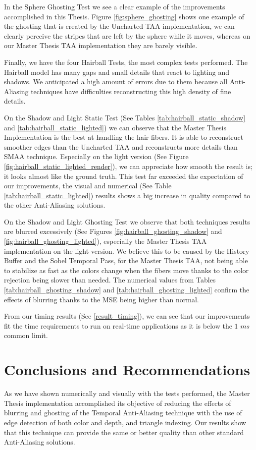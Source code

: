 \documentclass[pregrado]{tesis-usb} %
\begin{document}
In the Sphere Ghosting Test we see a clear example of the improvements accomplished in this Thesis. Figure \ref{fig:sphere_ghosting} shows one example of the ghosting that is created by the Uncharted TAA implementation, we can clearly perceive the stripes that are left by the sphere while it moves, whereas on our Master Thesis TAA implementation they are barely visible.

Finally, we have the four Hairball Tests, the most complex tests performed. The Hairball model has many gaps and small details that react to lighting and shadows. We anticipated a high amount of errors due to them because all Anti-Aliasing techniques have difficulties reconstructing this high density of fine details. 

On the Shadow and Light Static Test (See Tables \ref{tab:hairball_static_shadow} and \ref{tab:hairball_static_lighted}) we can observe that the Master Thesis Implementation is the best at handling the hair fibers. It is able to reconstruct smoother edges than the Uncharted TAA and reconstructs more details than SMAA technique. Especially on the light version (See Figure \ref{fig:hairball_static_lighted_render}), we can appreciate how smooth the result is; it looks almost like the ground truth. This test far exceeded the expectation of our improvements, the visual and numerical (See Table \ref{tab:hairball_static_lighted}) results shows a big increase in quality compared to the other Anti-Aliasing solutions.

On the Shadow and Light Ghosting Test we observe that both techniques results are blurred excessively (See Figures \ref{fig:hairball_ghosting_shadow} and \ref{fig:hairball_ghosting_lighted}), especially the Master Thesis TAA implementation on the light version. We believe this to be caused by the History Buffer and the Sobel Temporal Pass, for the Master Thesis TAA, not being able to stabilize as fast as the colors change when the fibers move thanks to the color rejection being slower than needed. The numerical values from Tables \ref{tab:hairball_ghosting_shadow} and \ref{tab:hairball_ghosting_lighted} confirm the effects of blurring thanks to the MSE being higher than normal.


From our timing results (See \ref{result_timing}), we can see that our improvements fit the time requirements to run on real-time applications as it is below the $1$ $ms$ common limit.


\chapter{Conclusions and Recommendations}
As we have shown numerically and visually with the tests performed, the Master Thesis implementation accomplished its objective of reducing the effects of blurring and ghosting of the Temporal Anti-Aliasing technique with the use of edge detection of both color and depth, and triangle indexing. Our results show that this technique can provide the same or better quality than other standard Anti-Aliasing solutions. 
\end{document}
